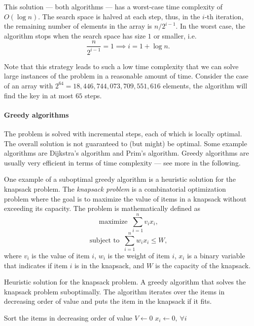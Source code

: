 
This solution --- both algorithms --- has a worst-case time complexity of $O(\log n)$. The
search space is halved at each step, thus, in the $i$-th iteration, the remaining number
of elements in the array is $n / 2^{i-1}$.  In the worst case, the algorithm stops when the
search space has size $1$ or smaller, i.e.
\[
  \frac{n}{2^{i-1}} = 1 \implies
  i = 1 + \log n\text{.}
\]

Note that this strategy leads to such a low time complexity that we can solve large instances
of the problem in a reasonable amount of time.  Consider the case of an array with $2^{64}
= 18{,}446{,}744{,}073{,}709{,}551{,}616$ elements, the algorithm will find the key in at most $65$
steps.

\paragraph{Greedy algorithms}  The problem is solved with incremental steps, each of which
is locally optimal.  The overall solution is not guaranteed to (but might) be optimal.  Some example
algorithms are Dijkstra's algorithm and Prim's algorithm.  Greedy algorithms are usually
very efficient in terms of time complexity --- see more in the following.

One example of a suboptimal greedy algorithm is a heuristic solution for the knapsack problem.
The \emph{knapsack problem} is a combinatorial optimization problem where the goal is to
maximize the value of items in a knapsack without exceeding its capacity.  The problem is
mathematically defined as
\[
  \text{maximize }~\sum_{i = 1}^n v_i x_i\text{,}
\]
\[
  \text{subject to }~\sum_{i = 1}^n w_i x_i \leq W\text{,}
\]
where $v_i$ is the value of item $i$, $w_i$ is the weight of item $i$, $x_i$ is a binary
variable that indicates if item $i$ is in the knapsack, and $W$ is the capacity of the
knapsack.

\begin{algorithm}
  \caption{
    Heuristic solution for the knapsack problem.
    A greedy algorithm that solves the knapsack problem suboptimally.  The algorithm iterates over
    the items in decreasing order of value and puts the item in the knapsack if it fits.
  }
  \label{alg:knapsack}
  Sort the items in decreasing order of value\;
  $V \gets 0$\;
  $x_i \gets 0,~\forall i$\;
\end{algorithm}


